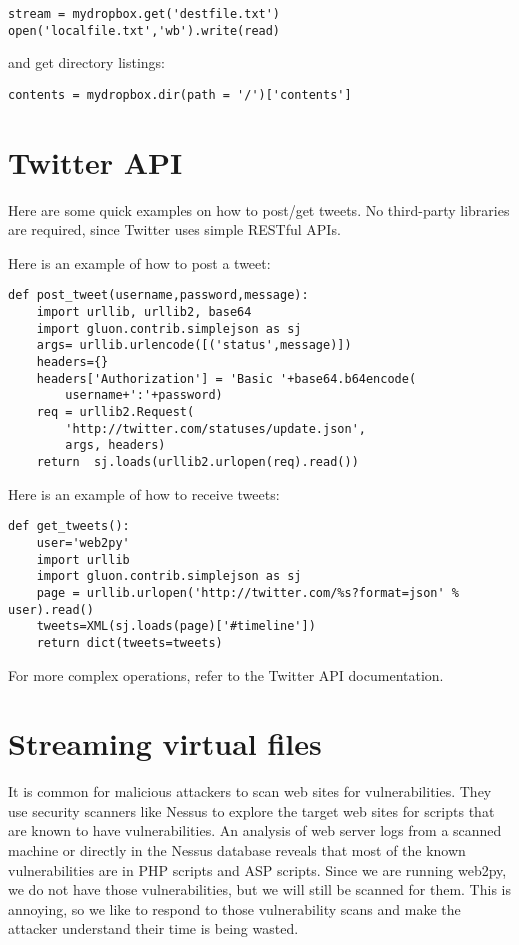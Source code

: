 \documentclass[justified,sixbynine,notoc]{tufte-book}
\def\inxx#1{\index{#1}}
\begin{document}
\begin{fullwidth}
\begin{lstlisting}
stream = mydropbox.get('destfile.txt')
open('localfile.txt','wb').write(read)
\end{lstlisting}
\noindent and get directory listings:

\begin{lstlisting}
contents = mydropbox.dir(path = '/')['contents']
\end{lstlisting}

\goodbreak\section{Twitter API}

Here are some quick examples on how to post/get tweets. No third-party libraries are required, since Twitter uses simple RESTful APIs.

Here is an example of how to post a tweet:
\begin{lstlisting}
def post_tweet(username,password,message):
    import urllib, urllib2, base64
    import gluon.contrib.simplejson as sj
    args= urllib.urlencode([('status',message)])
    headers={}
    headers['Authorization'] = 'Basic '+base64.b64encode(
        username+':'+password)
    req = urllib2.Request(
        'http://twitter.com/statuses/update.json',
        args, headers)
    return  sj.loads(urllib2.urlopen(req).read())
\end{lstlisting}

Here is an example of how to receive tweets:
\begin{lstlisting}
def get_tweets():
    user='web2py'
    import urllib
    import gluon.contrib.simplejson as sj
    page = urllib.urlopen('http://twitter.com/%s?format=json' % user).read()
    tweets=XML(sj.loads(page)['#timeline'])
    return dict(tweets=tweets)
\end{lstlisting}

For more complex operations, refer to the Twitter API documentation.

\goodbreak\section{Streaming virtual files}

\inxx{streaming}

It is common for malicious attackers to scan web sites for vulnerabilities. They use security scanners like Nessus to explore the target web sites for scripts that are known to have vulnerabilities. An analysis of web server logs from a scanned machine or directly in the Nessus database reveals that most of the known vulnerabilities are in PHP scripts and ASP scripts. Since we are running web2py, we do not have those vulnerabilities, but we will still be scanned for them. This is annoying, so we like to respond to those vulnerability scans and make the attacker understand their time is being wasted.


\end{fullwidth}
\end{document}
